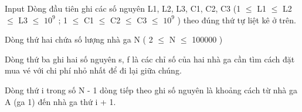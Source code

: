 Input
Dòng đầu tiên ghi các số nguyên L1, L2, L3, C1, C2, C3 (1  $\le$  L1  $\le$  L2  $\le$  L3  $\le$  $10^{9}$   ;  1  $\le$  C1  $\le$  C2  $\le$  C3  $\le$  $10^{9}$   ) theo đúng thứ tự liệt kê ở trên.  

   Dòng thứ hai chứa số lượng nhà ga N ( 2  $\le$  N  $\le$  100000 )  

   Dòng thứ ba ghi hai số nguyên s, f là các chỉ số của hai nhà ga cần tìm cách đặt mua vé với chi phí nhỏ nhất để đi lại giữa chúng.  

   Dòng thứ i trong số N - 1 dòng tiếp theo ghi số nguyên là khoảng cách từ nhà ga A (ga 1) đến nhà ga thứ i + 1.